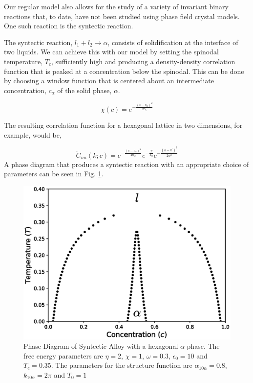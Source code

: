 \documentclass[showkeys, prb, reprint]{revtex4-1}
\newcommand{\f}{\frac}
\begin{document}
Our regular model also allows for the study of a variety of invariant binary
reactions that, to date, have not been studied using phase field crystal
models. One such reaction is the syntectic reaction. 

The syntectic reaction, $l_1 + l_2 \rightarrow \alpha $, consists of
solidification at the interface of two liquids. We can achieve this with our
model by setting the spinodal temperature, $T_c$, sufficiently high and
producing a density-density correlation function that is peaked at a
concentration below the spinodal. This can be done by choosing a window
function that is centered about an intermediate concentration, $c_\alpha$ of
the solid phase, $\alpha$. 

\begin{equation}
  \chi(c) = e^{- \f{(c - c_\alpha)^2}{2 \alpha_c}}
\end{equation}

The resulting correlation function for a hexagonal lattice in two dimensions,
for example, would be,

\begin{equation}
  \tilde{C}_{nn}(k; c) = e^{-\f{(c - c_\alpha)^2}{2 \alpha_c}} e^{-\f{T}{T_0}} e^{-\f{(k - k^\prime)^2}{2\alpha^2}}
\end{equation}
A phase diagram that produces a syntectic reaction with an appropriate choice
of parameters can be seen in Fig. \ref{syntectic}.

\begin{figure}
	\includegraphics[scale=0.5]{syntectic.eps}
	\caption{\label{syntectic} Phase Diagram of Syntectic Alloy with a hexagonal $\alpha$ phase. The free energy parameters are $\eta=2$, $\chi=1$, $\omega=0.3$, $\epsilon_0 = 10$ and $T_c=0.35$. The parameters for the structure function are $\alpha_{10\alpha} = 0.8$, $k_{10\alpha} = 2\pi$ and $T_0 = 1$}
\end{figure}
\end{document}
